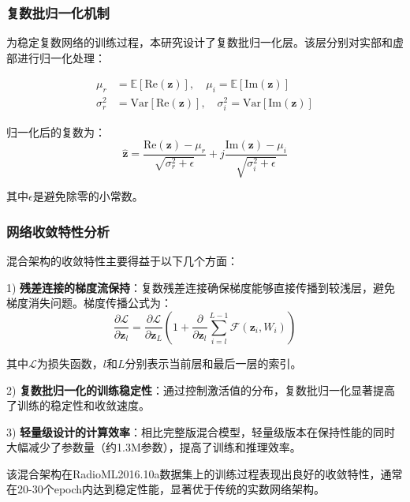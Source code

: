 \documentclass[conference]{IEEEtran}
\begin{document}
\subsubsection{复数批归一化机制}

为稳定复数网络的训练过程，本研究设计了复数批归一化层。该层分别对实部和虚部进行归一化处理：

\begin{equation}
\begin{aligned}
\mu_r &= \mathbb{E}[\text{Re}(\mathbf{z})], \quad \mu_i = \mathbb{E}[\text{Im}(\mathbf{z})] \\
\sigma_r^2 &= \text{Var}[\text{Re}(\mathbf{z})], \quad \sigma_i^2 = \text{Var}[\text{Im}(\mathbf{z})]
\end{aligned}
\end{equation}

归一化后的复数为：
\begin{equation}
\hat{\mathbf{z}} = \frac{\text{Re}(\mathbf{z}) - \mu_r}{\sqrt{\sigma_r^2 + \epsilon}} + j\frac{\text{Im}(\mathbf{z}) - \mu_i}{\sqrt{\sigma_i^2 + \epsilon}}
\end{equation}

其中$\epsilon$是避免除零的小常数。

\subsubsection{网络收敛特性分析}

混合架构的收敛特性主要得益于以下几个方面：

1) \textbf{残差连接的梯度流保持}：复数残差连接确保梯度能够直接传播到较浅层，避免梯度消失问题。梯度传播公式为：
\begin{equation}
\frac{\partial \mathcal{L}}{\partial \mathbf{z}_l} = \frac{\partial \mathcal{L}}{\partial \mathbf{z}_L} \left(1 + \frac{\partial}{\partial \mathbf{z}_l}\sum_{i=l}^{L-1}\mathcal{F}(\mathbf{z}_i, W_i)\right)
\end{equation}

其中$\mathcal{L}$为损失函数，$l$和$L$分别表示当前层和最后一层的索引。

2) \textbf{复数批归一化的训练稳定性}：通过控制激活值的分布，复数批归一化显著提高了训练的稳定性和收敛速度。

3) \textbf{轻量级设计的计算效率}：相比完整版混合模型，轻量级版本在保持性能的同时大幅减少了参数量（约1.3M参数），提高了训练和推理效率。

该混合架构在RadioML2016.10a数据集上的训练过程表现出良好的收敛特性，通常在20-30个epoch内达到稳定性能，显著优于传统的实数网络架构。
\end{document}
